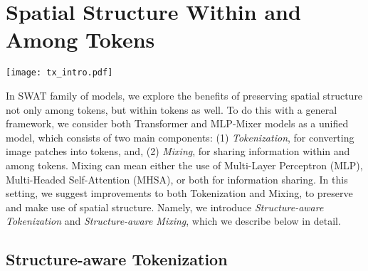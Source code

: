\documentclass[10pt,twocolumn,letterpaper]{article}
\newcommand{\fref}[1]{Fig.~\ref{#1}}
\begin{document}
\section{Spatial Structure Within and Among Tokens}
\label{sec:method}

\begin{figure*}[t]
	\centering
	\texttt{[image: tx\_intro.pdf]}
	\caption{\textbf{SWAT Overview:} We show the architecture of SWAT (bottom) and a baseline model (top) in this figure. We propose two main contributions: (1) Structure-aware Tokenization and, (2) Structure-aware Mixing, which can be applied to common Transformer or Mixer architectures with minimal effort. Structure-aware tokenization preserves the spatial structure within a token, as channel segments. Simply put, first, we tokenize with a patch size $(p/\alpha\times p/\alpha)$ instead of $(p\times p)$, resulting in $\times\alpha^2$ more intermediate tokens. Next, we restructure $\alpha\times\alpha$ neighboring tokens into one token (concatenating in channel dimension), which gives the same number of tokens (and the channel dimension) into  Mixing operations, ensuring no additional cost in the downstream. However, now, this newly-preserved structure within tokens can be explored for better downstream processing, which was very limited previously. More on how we use the structure in Mixing is shown in \fref{fig:swat_deit} and \fref{fig:swat_mixer}.}
	\label{fig:overview}
\end{figure*}


In SWAT family of models, we explore the benefits of preserving spatial structure not only among tokens, but within tokens as well. To do this with a general framework, we consider both Transformer and MLP-Mixer models as a unified model, which consists of two main components: (1) \textit{Tokenization}, for converting image patches into tokens, and, (2) \textit{Mixing}, for sharing information within and among tokens. Mixing can mean either the use of Multi-Layer Perceptron (MLP), Multi-Headed Self-Attention (MHSA), or both for information sharing. In this setting, we suggest improvements to both Tokenization and Mixing, to preserve and make use of spatial structure. Namely, we introduce \textit{Structure-aware Tokenization} and \textit{Structure-aware Mixing}, which we describe below in detail.

\subsection{Structure-aware Tokenization}
\end{document}
